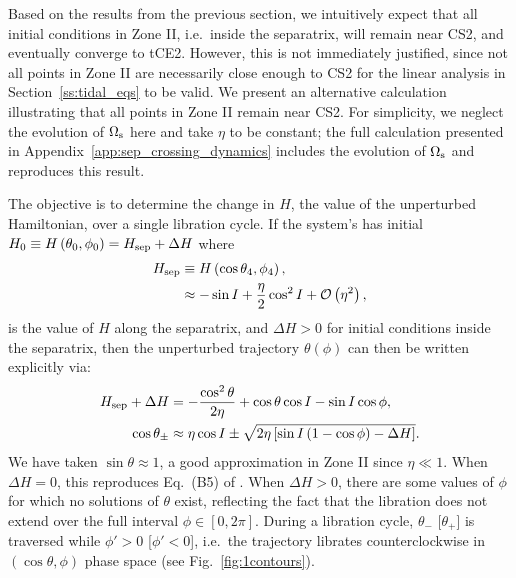 \documentclass[
        fleqn,
        usenatbib,
    ]{mnras}
\newcommand*{\p}[1]{\left(#1\right)}
\newcommand*{\s}[1]{\left[#1\right]}
\begin{document}
Based on the results from the previous section, we intuitively expect that all
initial conditions in Zone II, i.e.\ inside the separatrix, will remain near
CS2, and eventually converge to tCE2. However, this is not immediately
justified, since not all points in Zone II are necessarily close enough to CS2
for the linear analysis in Section~\ref{ss:tidal_eqs} to be valid. We present an
alternative calculation illustrating that all points in Zone II remain near CS2.
For simplicity, we neglect the evolution of $\Omega_{\rm s}$ here and take
$\eta$ to be constant; the full calculation presented in
Appendix~\ref{app:sep_crossing_dynamics} includes the evolution of $\Omega_{\rm
s}$ and reproduces this result.

The objective is to determine the change in $H$, the value of the unperturbed
Hamiltonian, over a single libration cycle. If the system's has initial $H_0
\equiv H\p{\theta_0, \phi_0} = H_{\rm sep} + \Delta H$ where
\begin{align}
    H_{\rm sep} &\equiv H\p{\cos \theta_{\rm 4}, \phi_{\rm 4}},\\
        &\approx -\sin I + \frac{\eta}{2}\cos^2 I +
            \mathcal{O}\p{\eta^2},\label{eq:def_Hsep}
\end{align}
is the value of $H$ along the separatrix, and $\Delta H > 0$ for initial
conditions inside the separatrix, then the unperturbed trajectory $\theta(\phi)$
can then be written explicitly via:
\begin{align}
    H_{\rm sep} + \Delta H &= -\frac{\cos^2\theta}{2\eta} + \cos\theta \cos I
            - \sin I \cos \phi,\\
    \cos \theta_{\pm} &\approx
        \eta \cos I \pm \sqrt{2\eta\s{\sin I\p{1 - \cos \phi} - \Delta H}}.
        \label{eq:lib_cycle_toy}
\end{align}
We have taken $\sin \theta \approx 1$, a good approximation in Zone II since
$\eta \ll 1$. When $\Delta H = 0$, this reproduces Eq.~(B5) of \citet{su2020}.
When $\Delta H > 0$, there are some values of $\phi$ for which no solutions of
$\theta$ exist, reflecting the fact that the libration does not extend over the
full interval $\phi \in [0, 2\pi]$. During a libration cycle, $\theta_-$
[$\theta_+$] is traversed while $\phi' > 0$ [$\phi' < 0$], i.e.\ the trajectory
librates counterclockwise in $(\cos \theta, \phi)$ phase space (see
Fig.~\ref{fig:1contours}).
\end{document}
